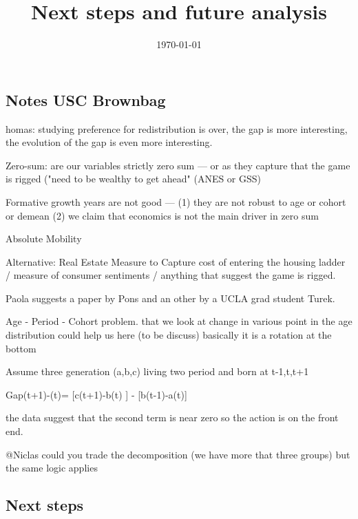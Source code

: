 \documentclass{article}
\title{Next steps and future analysis}
\date{\today}
\begin{document}
\maketitle

\subsection*{Notes USC Brownbag }

homas: studying preference for redistribution is over, the gap is more interesting, the evolution of the gap is even more interesting.

Zero-sum: are our variables strictly zero sum --- or as they capture that the game is rigged ("need to be wealthy to get ahead" (ANES or GSS)

Formative growth years are not good --- (1) they are not robust to age or cohort or demean (2) we claim that economics is not the main driver in zero sum

Absolute Mobility

Alternative: Real Estate Measure to Capture cost of entering the housing ladder  / measure of consumer sentiments / anything that suggest the game is rigged.

Paola suggests a paper by Pons and an other by a UCLA grad student Turek.

Age - Period - Cohort problem. that we look at change in various point in the age distribution could help us here (to be discuss) basically it is a rotation at the bottom

Assume three generation  (a,b,c) living two period and born at t-1,t,t+1

Gap(t+1)-(t)= [c(t+1)-b(t) ] - [b(t-1)-a(t)]

the data suggest that the second term is near zero so the action is on the front end.

@Niclas could you trade the decomposition (we have more that three groups) but the same logic applies


\subsection*{Next steps}
\end{document}
